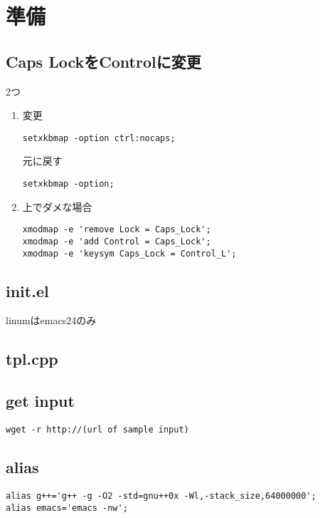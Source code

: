 \section{準備}
\subsection{Caps LockをControlに変更}
2つ
\begin{enumerate}
  \item
    変更
    \begin{lstlisting}
setxkbmap -option ctrl:nocaps;
    \end{lstlisting}
    元に戻す
    \begin{lstlisting}
setxkbmap -option;
    \end{lstlisting}
  \item
    上でダメな場合
    \begin{lstlisting}
xmodmap -e 'remove Lock = Caps_Lock';
xmodmap -e 'add Control = Caps_Lock';
xmodmap -e 'keysym Caps_Lock = Control_L';
    \end{lstlisting}
\end{enumerate}

\subsection{init.el}
linumはemacs24のみ\par


\subsection{tpl.cpp}


\subsection{get input}
\begin{lstlisting}
wget -r http://(url of sample input)
\end{lstlisting}

\subsection{alias}
\begin{lstlisting}
alias g++='g++ -g -O2 -std=gnu++0x -Wl,-stack_size,64000000';
alias emacs='emacs -nw';
\end{lstlisting}
